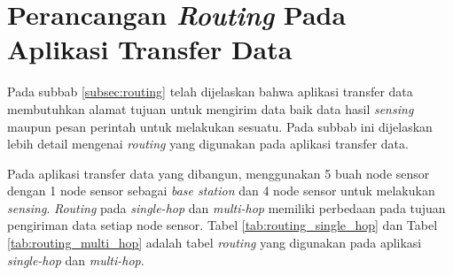 \section{Perancangan \textit{Routing} Pada Aplikasi Transfer Data}
Pada subbab \ref{subsec:routing} telah dijelaskan bahwa aplikasi transfer data membutuhkan alamat tujuan untuk mengirim data baik data hasil \textit{sensing} maupun pesan perintah untuk melakukan sesuatu. Pada subbab ini dijelaskan lebih detail mengenai \textit{routing} yang digunakan pada aplikasi transfer data. 

Pada aplikasi transfer data yang dibangun, menggunakan 5 buah node sensor dengan 1 node sensor sebagai \textit{base station} dan 4 node sensor untuk melakukan \textit{sensing}. \textit{Routing} pada \textit{single-hop} dan \textit{multi-hop} memiliki perbedaan pada tujuan pengiriman data setiap node sensor. Tabel \ref{tab:routing_single_hop} dan Tabel \ref{tab:routing_multi_hop} adalah tabel \textit{routing} yang digunakan pada aplikasi \textit{single-hop} dan \textit{multi-hop}.

